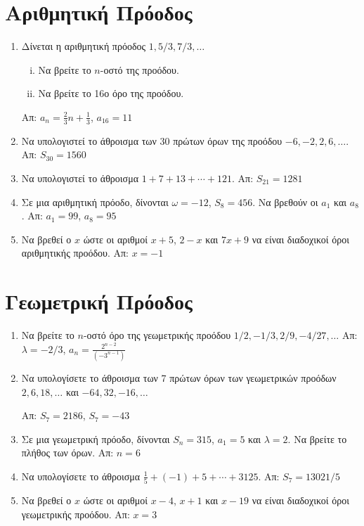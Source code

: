 \section*{Αριθμητική Πρόοδος}

\begin{enumerate}
  \item Δίνεται η αριθμητική πρόοδος $ 1,5/3,7/3, \ldots $
    \begin{enumerate}[i)]
      \item Να βρείτε το $n$-οστό της προόδου.
      \item Να βρείτε το 16ο όρο της προόδου.
    \end{enumerate}
    \hfill Απ: $ a_{n}= \frac{2}{3} n + \frac{1}{3} $, $ a_{16}=11 $

  \item Να υπολογιστεί το άθροισμα των 30 πρώτων όρων της προόδου $ -6,-2,2,6,\ldots $.
    \hfill Απ: $ S_{30}=1560 $ 

  \item Να υπολογιστεί το άθροισμα $ 1+7+13+\cdots +121 $.
    \hfill Απ: $ S_{21} = 1281 $ 

  \item Σε μια αριθμητική πρόοδο, δίνονται $ \omega = -12 $, $ S_{8}=456 $. Να βρεθούν 
    οι $ a_{1} $ και $ a_{8} $.
    \hfill Απ: $ a_{1}= 99 $, $ a_{8}=95 $ 

  \item Να βρεθεί ο $ x $ ώστε οι αριθμοί $ x+5 $, $ 2-x $ και $ 7x+9 $ να είναι 
    διαδοχικοί όροι αριθμητικής προόδου.
    \hfill Απ: $ x=-1 $ 
\end{enumerate}



\section*{Γεωμετρική Πρόοδος}

\begin{enumerate}
  \item Να βρείτε το $n$-οστό όρο της γεωμετρικής προόδου
    $
      1/2,-1/3,2/9,-4/27,\ldots 
    $
    \hfill Απ: $\lambda = -2/3 $, $ a_{n}= \frac{2^{n-2}}{(-3^{n-1})} $ 

  \item Να υπολογίσετε το άθροισμα των 7 πρώτων όρων των γεωμετρικών προόδων
    $ 2,6,18, \ldots $ και $-64,32,-16,\ldots $ 

    \hfill Απ: $ S_{7}=2186 $, $ S_{7} = -43 $ 

  \item Σε μια γεωμετρική πρόοδο, δίνονται $ S_{n}=315 $, $ a_{1}=5 $ και 
    $ \lambda = 2 $. Να βρείτε το πλήθος των όρων.
    \hfill Απ: $ n=6 $ 

  \item Να υπολογίσετε το άθροισμα $ \frac{1}{5} + (-1) + 5 + \cdots + 3125 $.
    \hfill Απ: $ S_{7} = 13021/5 $ 

  \item Να βρεθεί ο $x$ ώστε οι αριθμοί $ x-4 $, $ x+1 $ και $ x-19 $ να είναι 
    διαδοχικοί όροι γεωμετρικής προόδου. 
    \hfill Απ: $ x=3 $ 
\end{enumerate}




